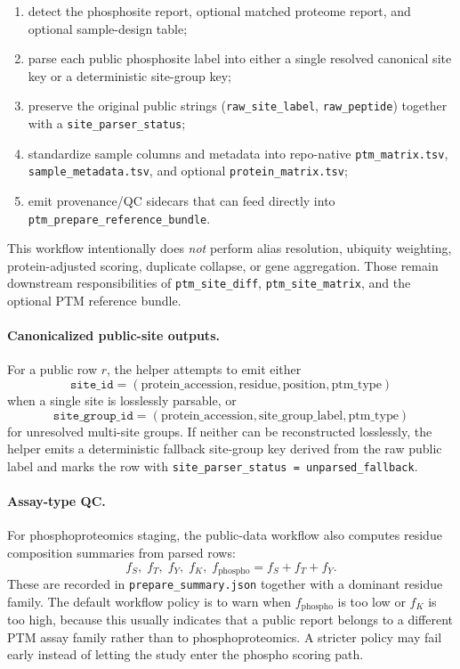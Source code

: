 \documentclass[11pt]{article}
\begin{document}
\begin{enumerate}
\item detect the phosphosite report, optional matched proteome report, and
optional sample-design table;
\item parse each public phosphosite label into either a single resolved
canonical site key or a deterministic site-group key;
\item preserve the original public strings
(\texttt{raw\_site\_label}, \texttt{raw\_peptide}) together with a
\texttt{site\_parser\_status};
\item standardize sample columns and metadata into repo-native
\texttt{ptm\_matrix.tsv}, \texttt{sample\_metadata.tsv}, and optional
\texttt{protein\_matrix.tsv};
\item emit provenance/QC sidecars that can feed directly into
\texttt{ptm\_prepare\_reference\_bundle}.
\end{enumerate}

This workflow intentionally does \emph{not} perform alias resolution,
ubiquity weighting, protein-adjusted scoring, duplicate collapse, or gene
aggregation. Those remain downstream responsibilities of
\texttt{ptm\_site\_diff}, \texttt{ptm\_site\_matrix}, and the optional PTM
reference bundle.

\paragraph{Canonicalized public-site outputs.}
For a public row $r$, the helper attempts to emit either
\[
\texttt{site\_id} = (\mathrm{protein\_accession}, \mathrm{residue},
\mathrm{position}, \mathrm{ptm\_type})
\]
when a single site is losslessly parsable, or
\[
\texttt{site\_group\_id} = (\mathrm{protein\_accession},
\mathrm{site\_group\_label}, \mathrm{ptm\_type})
\]
for unresolved multi-site groups. If neither can be reconstructed losslessly,
the helper emits a deterministic fallback site-group key derived from the raw
public label and marks the row with
\texttt{site\_parser\_status = unparsed\_fallback}.

\paragraph{Assay-type QC.}
For phosphoproteomics staging, the public-data workflow also computes residue
composition summaries from parsed rows:
\[
f_S,\; f_T,\; f_Y,\; f_K,\; f_{\mathrm{phospho}} = f_S + f_T + f_Y.
\]
These are recorded in \texttt{prepare\_summary.json} together with a dominant
residue family. The default workflow policy is to warn when
$f_{\mathrm{phospho}}$ is too low or $f_K$ is too high, because this usually
indicates that a public report belongs to a different PTM assay family rather
than to phosphoproteomics. A stricter policy may fail early instead of letting
the study enter the phospho scoring path.
\end{document}
